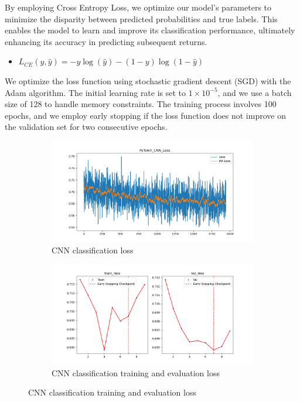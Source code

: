 \documentclass{article}
\begin{document}
By employing Cross Entropy Loss, we optimize our model's parameters to minimize the disparity between predicted probabilities and true labels. This enables the model to learn and improve its classification performance, ultimately enhancing its accuracy in predicting subsequent returns.

\begin{itemize}
    \setlength\itemindent{2em}
    \item[] \emph{$L_{CE}(y, \hat{y}) = -y\log(\hat{y}) - (1-y)\log(1-\hat{y})$}
\end{itemize}
	

We optimize the loss function using stochastic gradient descent (SGD) with the Adam algorithm. The initial learning rate is set to $1\times10^{-5}$, and we use a batch size of 128 to handle memory constraints. The training process involves 100 epochs, and we employ early stopping if the loss function does not improve on the validation set for two consecutive epochs.

\begin{figure}[H]
	\centering
	\begin{subfigure}[c]{0.49\linewidth}
		\centering	\includegraphics[width=0.8\linewidth]{4 CNN_classification_loss.png}
		\caption*{CNN classification loss}
	\end{subfigure}
	\hfill
	\begin{subfigure}[c]{0.49\linewidth}
		\centering
  \includegraphics[width=0.8\linewidth]{5 CNN classification training and evaluation loss.png}
		\caption*{CNN classification training and evaluation loss}
	\end{subfigure}
	\caption{CNN classification training and evaluation loss}
\end{figure}
\end{document}
